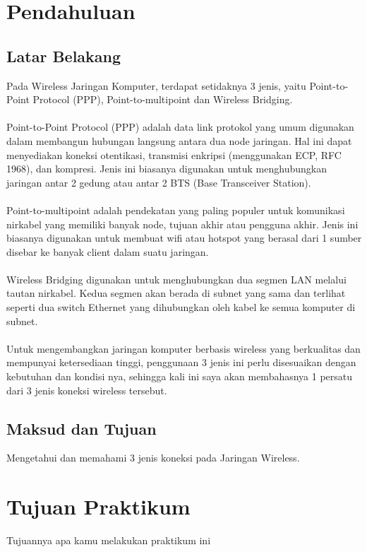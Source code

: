 \section{Pendahuluan}
\subsection{Latar Belakang}
Pada Wireless Jaringan Komputer, terdapat setidaknya 3 jenis, yaitu Point-to-Point Protocol (PPP),
Point-to-multipoint dan Wireless Bridging. 
\\ \\Point-to-Point Protocol (PPP) adalah data link protokol yang umum digunakan dalam membangun 
hubungan langsung antara dua node jaringan. Hal ini dapat menyediakan koneksi otentikasi, transmisi enkripsi (menggunakan ECP, RFC 1968), dan kompresi. 
Jenis ini biasanya digunakan untuk menghubungkan jaringan antar 2 gedung atau antar 2 BTS (Base Transceiver Station).
\\ \\Point-to-multipoint adalah pendekatan yang paling populer untuk komunikasi nirkabel yang memiliki banyak node, tujuan akhir atau pengguna akhir. 
Jenis ini biasanya digunakan untuk membuat wifi atau hotspot yang berasal dari 1 sumber disebar ke banyak client dalam suatu jaringan.
\\ \\Wireless Bridging digunakan untuk menghubungkan dua segmen LAN melalui tautan nirkabel. Kedua
segmen akan berada di subnet yang sama dan terlihat seperti dua switch Ethernet yang dihubungkan
oleh kabel ke semua komputer di subnet.
\\ \\Untuk mengembangkan jaringan komputer berbasis wireless yang berkualitas dan mempunyai ketersediaan tinggi, penggunaan 3 jenis ini perlu disesuaikan dengan kebutuhan dan kondisi nya, sehingga
kali ini saya akan membahasnya 1 persatu dari 3 jenis koneksi wireless tersebut.

\subsection{Maksud dan Tujuan}
Mengetahui dan memahami 3 jenis koneksi pada Jaringan Wireless.

\section{Tujuan Praktikum}
Tujuannya apa kamu melakukan praktikum ini

